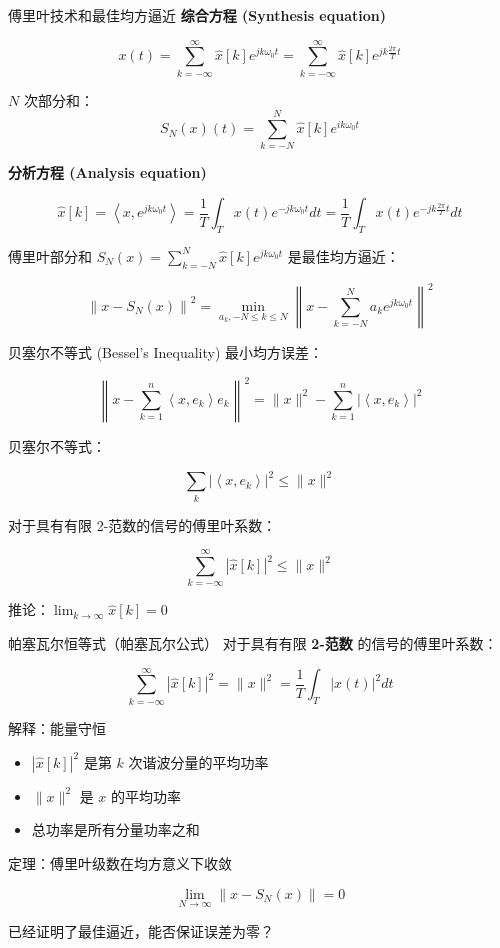 \documentclass[
  ignorenonframetext,
]{beamer}
\providecommand{\tightlist}{%
  \setlength{\itemsep}{0pt}\setlength{\parskip}{0pt}}
\begin{document}
\begin{frame}{傅里叶技术和最佳均方逼近}
\protect{}\label{ux5085ux91ccux53f6ux6280ux672fux548cux6700ux4f73ux5747ux65b9ux903cux8fd1}
\textbf{综合方程 (Synthesis equation)}

\[
x(t)=\sum_{k=-\infty}^{\infty} \hat{x}[k] e^{j k \omega_{0} t}=\sum_{k=-\infty}^{\infty} \hat{x}[k] e^{j k \frac{2 \pi}{T} t}
\]

\(N\) 次部分和： \[
S_{N}(x)(t)=\sum_{k=-N}^{N} \hat{x}[k] e^{i k \omega_{0} t}
\]

\textbf{分析方程 (Analysis equation)}

\[
\hat{x}[k]=\left\langle x, e^{j k \omega_{0} t}\right\rangle=\frac{1}{T} \int_{T} x(t) e^{-j k \omega_{0} t} d t=\frac{1}{T} \int_{T} x(t) e^{-j k \frac{2 \pi}{T} t} d t
\]

傅里叶部分和
\(S_{N}(x)=\sum_{k=-N}^{N} \hat{x}[k] e^{j k \omega_{0} t}\)
是最佳均方逼近：

\[
\left\|x-S_{N}(x)\right\|^{2}=\min _{a_{k},-N \leq k \leq N}\left\|x-\sum_{k=-N}^{N} a_{k} e^{j k \omega_{0} t}\right\|^{2}
\]
\end{frame}

\begin{frame}{贝塞尔不等式 (Bessel's Inequality)}
\protect{}\label{ux8d1dux585eux5c14ux4e0dux7b49ux5f0f-bessels-inequality}
最小均方误差：

\[
\left\|x-\sum_{k=1}^{n}\left\langle x, e_{k}\right\rangle e_{k}\right\|^{2}=\|x\|^{2}-\sum_{k=1}^{n}\left|\left\langle x, e_{k}\right\rangle\right|^{2}
\]

贝塞尔不等式：

\[
\sum_{k}\left|\left\langle x, e_{k}\right\rangle\right|^{2} \leq\|x\|^{2}
\]

对于具有有限 2-范数的信号的傅里叶系数：

\[
\sum_{k=-\infty}^{\infty}|\hat{x}[k]|^{2} \leq\|x\|^{2}
\]

推论：\(\lim _{k \rightarrow \infty} \hat{x}[k]=0\)
\end{frame}

\begin{frame}{帕塞瓦尔恒等式（帕塞瓦尔公式）}
\protect{}\label{ux5e15ux585eux74e6ux5c14ux6052ux7b49ux5f0fux5e15ux585eux74e6ux5c14ux516cux5f0f}
对于具有有限 \textbf{2-范数} 的信号的傅里叶系数：

\[
\sum_{k=-\infty}^{\infty}|\hat{x}[k]|^{2}=\|x\|^{2}=\frac{1}{T} \int_{T}|x(t)|^{2} d t
\]

解释：能量守恒

\begin{itemize}
\tightlist
\item
  \(|\hat{x}[k]|^{2}\) 是第 \(k\) 次谐波分量的平均功率
\item
  \(\|x\|^{2}\) 是 \(x\) 的平均功率
\item
  总功率是所有分量功率之和
\end{itemize}

定理：傅里叶级数在均方意义下收敛

\[
\lim _{N \rightarrow \infty}\left\|x-S_{N}(x)\right\|=0
\]

已经证明了最佳逼近，能否保证误差为零？
\end{frame}
\end{document}
